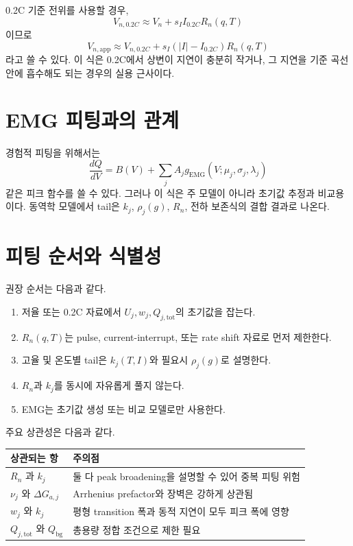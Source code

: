 \documentclass[11pt,a4paper]{article}
\newcommand{\app}{\mathrm{app}}
\newcommand{\bg}{\mathrm{bg}}
\newcommand{\tot}{\mathrm{tot}}
\begin{document}
0.2C 기준 전위를 사용할 경우,
\begin{equation}
V_{n,0.2C}\approx V_n+s_II_{0.2C}R_n(q,T)
\end{equation}
이므로
\begin{equation}
V_{n,\app}\approx V_{n,0.2C}+s_I\left(|I|-I_{0.2C}\right)R_n(q,T)
\label{eq:02c}
\end{equation}
라고 쓸 수 있다. 이 식은 0.2C에서 상변이 지연이 충분히 작거나, 그 지연을 기준 곡선 안에 흡수해도 되는 경우의 실용 근사이다.

\section{EMG 피팅과의 관계}
경험적 피팅을 위해서는
\begin{equation}
\frac{dQ}{dV}=B(V)+\sum_jA_jg_{\mathrm{EMG}}(V;\mu_j,\sigma_j,\lambda_j)
\end{equation}
같은 피크 함수를 쓸 수 있다. 그러나 이 식은 주 모델이 아니라 초기값 추정과 비교용이다. 동역학 모델에서 tail은 \(k_j\), \(\rho_j(g)\), \(R_n\), 전하 보존식의 결합 결과로 나온다.

\section{피팅 순서와 식별성}
권장 순서는 다음과 같다.
\begin{enumerate}[label=\arabic*)]
\item 저율 또는 0.2C 자료에서 \(U_j,w_j,Q_{j,\tot}\)의 초기값을 잡는다.
\item \(R_n(q,T)\)는 pulse, current-interrupt, 또는 rate shift 자료로 먼저 제한한다.
\item 고율 및 온도별 tail은 \(k_j(T,I)\)와 필요시 \(\rho_j(g)\)로 설명한다.
\item \(R_n\)과 \(k_j\)를 동시에 자유롭게 풀지 않는다.
\item EMG는 초기값 생성 또는 비교 모델로만 사용한다.
\end{enumerate}

주요 상관성은 다음과 같다.
\begin{longtable}{p{} p{}}
\toprule
상관되는 항 & 주의점 \\
\midrule
\endhead
\(R_n\) 과 \(k_j\) & 둘 다 peak broadening을 설명할 수 있어 중복 피팅 위험 \\
\(\nu_j\) 와 \(\Delta G_{a,j}\) & Arrhenius prefactor와 장벽은 강하게 상관됨 \\
\(w_j\) 와 \(k_j\) & 평형 transition 폭과 동적 지연이 모두 피크 폭에 영향 \\
\(Q_{j,\tot}\) 와 \(Q_{\bg}\) & 총용량 정합 조건으로 제한 필요 \\
\bottomrule
\end{longtable}
\end{document}
